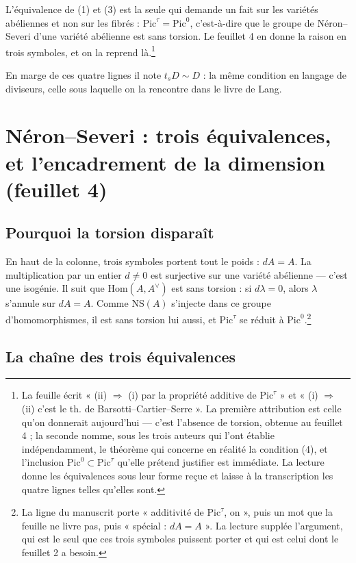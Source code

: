 \documentclass[11pt,a4paper]{article}
\begin{document}
L'équivalence de (1) et (3) est la seule qui demande un fait sur les variétés
abéliennes et non sur les fibrés : $\mathrm{Pic}^{\tau} = \mathrm{Pic}^{0}$,
c'est-à-dire que le groupe de Néron--Severi d'une variété abélienne est sans
torsion. Le feuillet 4 en donne la raison en trois symboles, et on la reprend
là.\footnote{La feuille écrit « (ii) $\Rightarrow$ (i) par la propriété
additive de $\mathrm{Pic}^{\tau}$ » et « (i) $\Rightarrow$ (ii) c'est le th. de
Barsotti--Cartier--Serre ». La première attribution est celle qu'on donnerait
aujourd'hui — c'est l'absence de torsion, obtenue au feuillet 4 ; la seconde
nomme, sous les trois auteurs qui l'ont établie indépendamment, le théorème qui
concerne en réalité la condition (4), et l'inclusion
$\mathrm{Pic}^{0} \subset \mathrm{Pic}^{\tau}$ qu'elle prétend justifier est
immédiate. La lecture donne les équivalences sous leur forme reçue et laisse à
la transcription les quatre lignes telles qu'elles sont.}

En marge de ces quatre lignes il note $t_{s}D \sim D$ : la même condition en
langage de diviseurs, celle sous laquelle on la rencontre dans le livre de
Lang.

\section*{Néron--Severi : trois équivalences, et l'encadrement de la dimension (feuillet 4)}

\subsection*{Pourquoi la torsion disparaît}

En haut de la colonne, trois symboles portent tout le poids : $dA = A$. La
multiplication par un entier $d \neq 0$ est surjective sur une variété
abélienne — c'est une isogénie. Il suit que $\mathrm{Hom}(A, A^{\vee})$ est
sans torsion : si $d\lambda = 0$, alors $\lambda$ s'annule sur $dA = A$. Comme
$\mathrm{NS}(A)$ s'injecte dans ce groupe d'homomorphismes, il est sans
torsion lui aussi, et $\mathrm{Pic}^{\tau}$ se réduit à
$\mathrm{Pic}^{0}$.\footnote{La ligne du manuscrit porte « additivité de
$\mathrm{Pic}^{\tau}$, on », puis un mot que la feuille ne livre pas, puis
« spécial : $dA = A$ ». La lecture supplée l'argument, qui est le seul que ces trois symboles
puissent porter et qui est celui dont le feuillet 2 a besoin.}

\subsection*{La chaîne des trois équivalences}
\end{document}
